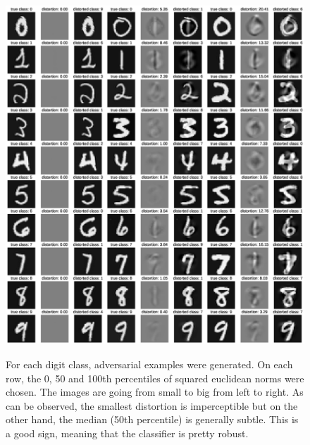 \documentclass{article} %
\begin{document}
\begin{figure}[h!]
\begin{center}
\includegraphics[scale=0.37]{figs/sup_5}
\label{exp:sup_5}
\caption{\small For each digit class, adversarial examples were generated. On each row, the 0, 50 and 100th percentiles of squared euclidean norms were chosen. The images are going from small to big from left to right. As can be observed, the smallest distortion is imperceptible but on the other hand, the median (50th percentile) is generally subtle. This is a good sign, meaning that the classifier is pretty robust.}
\end{center}
\end{figure}

\null
\vfill
\raggedbottom
\pagebreak
\newpage
\end{document}
